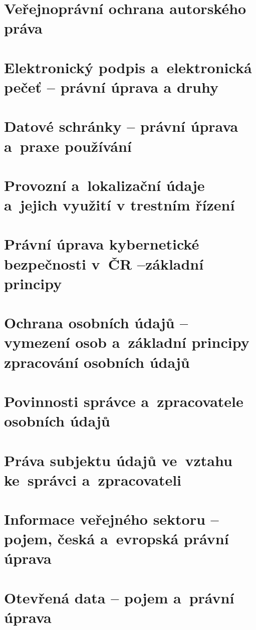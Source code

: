 \section{Veřejnoprávní ochrana autorského práva}

\newpage
\section[Elektronický podpis a~elektronická pečeť -- právní úprava a~druhy]{Elektronický podpis a~elektronická pečeť -- \newline právní úprava a druhy}

\newpage
\section{Datové schránky -- právní úprava a~praxe používání}

\newpage
\section{Provozní a~lokalizační údaje a~jejich využití v trestním řízení}

\newpage
\section[Právní úprava kybernetické bezpečnosti v ČR -- základní principy]{Právní úprava kybernetické bezpečnosti v~ČR --\newline základní principy}

\newpage
\section{Ochrana osobních údajů -- vymezení osob a~základní principy zpracování osobních údajů}

\newpage
\section{Povinnosti správce a~zpracovatele osobních údajů}

\newpage
\section{Práva subjektu údajů ve~vztahu ke~správci a~zpracovateli}

\newpage
\section{Informace veřejného sektoru -- pojem, česká a~evropská právní úprava}

\newpage
\section{Otevřená data -- pojem a~právní úprava}
